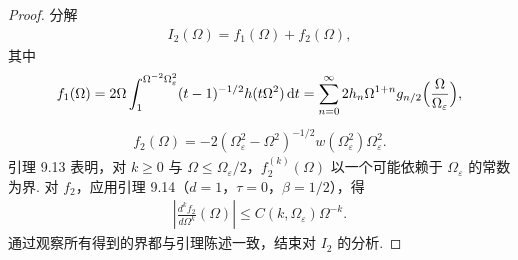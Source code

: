 \begin{proof}
分解
\begin{align*}
  I_{2}(\Omega)=f_{1}(\Omega)+f_{2}(\Omega),
\end{align*}
其中
\begin{align*}
  f_{1}(\Omega)=2\Omega\int_{1}^{\Omega^{-2}\Omega_{\varepsilon}^{2}}(t-1)^{-1/2}h(t\Omega^{2})\,\mathrm{d}t
  =\sum_{n=0}^{\infty}2h_{n}\Omega^{1+n}g_{n/2}\Bigl(\frac{\Omega}{\Omega_{\varepsilon}}\Bigr),
\end{align*}
\begin{align*}
  f_{2}(\Omega)=-2(\Omega_{\varepsilon}^{2}-\Omega^{2})^{-1/2}w(\Omega_{\varepsilon}^{2})\Omega_{\varepsilon}^{2}.
\end{align*}
引理 9.13 表明，对 $k \geq 0$ 与 $\Omega \leq \Omega_\varepsilon/2$，$f_2^{(k)}(\Omega)$ 以一个可能依赖于 $\Omega_\varepsilon$ 的常数为界. 对 $f_2$，应用引理 9.14（$d = 1$，$\tau = 0$，$\beta = 1/2$），得
\begin{align*}
  \left|\frac{d^{k}f_{2}}{d\Omega^{k}}(\Omega)\right|\leq C(k,\Omega_{\varepsilon})\Omega^{-k}.
\end{align*}
通过观察所有得到的界都与引理陈述一致，结束对 $I_{2}$ 的分析.


\end{proof}

